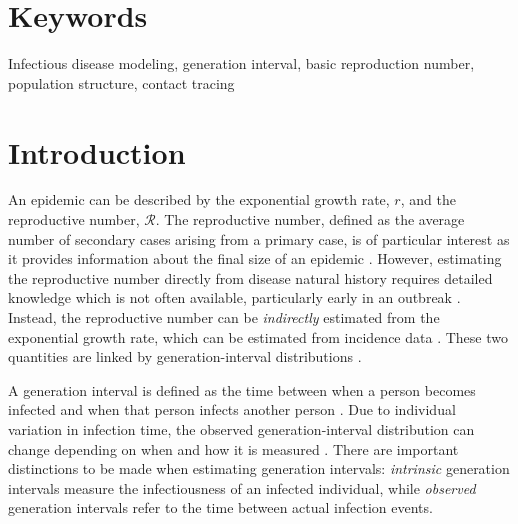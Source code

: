 \documentclass[12pt]{article}
\newcommand{\RR}{\ensuremath{{\mathcal R}}}
\begin{document}
\section*{Keywords}

Infectious disease modeling, generation interval, basic reproduction number, population structure, contact tracing

\pagebreak

\section{Introduction}

An epidemic can be described by the exponential growth rate, $r$, and the reproductive number, \RR.
The reproductive number, defined as the average number of secondary cases arising from a primary case, is of particular interest as it provides information about the final size of an epidemic \citep{anderson1991infectious, diekmann1990definition}.
However, estimating the reproductive number directly from disease natural history requires detailed knowledge which is not often available, particularly early in an outbreak \citep{dietz1993estimation}.
Instead, the reproductive number can be \emph{indirectly} estimated from the exponential growth rate, which can be estimated from incidence data \citep{chowell2003sars, mills2004transmissibility, nishiura2009transmission, nishiura2010pros, ma2014estimating}.
These two quantities are linked by generation-interval distributions \citep{wearing2005appropriate, svensson2007note, roberts2007model, wallinga2007generation, park2019practical}.

A generation interval is defined as the time between when a person becomes infected and when that person infects another person \citep{svensson2007note}.
Due to individual variation in infection time, the observed generation-interval distribution can change depending on when and how it is measured \citep{svensson2007note, kenah2008generation, nishiura2010time, champredon2015intrinsic}.
There are important distinctions to be made when estimating generation intervals: \emph{intrinsic} generation intervals measure the infectiousness of an infected individual,
while \emph{observed} generation intervals refer to the time between actual infection events.
\end{document}
